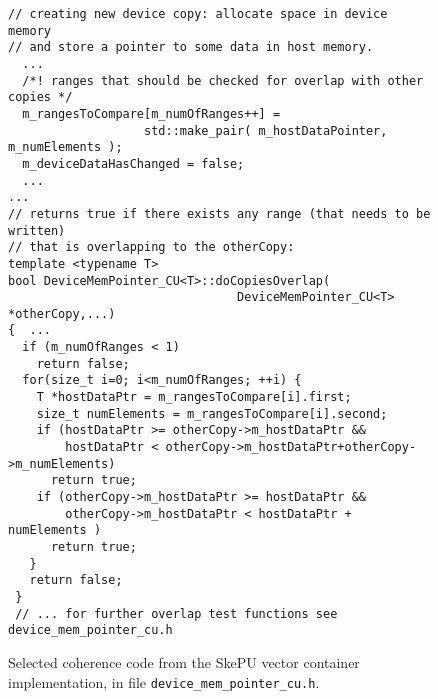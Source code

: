   
\begin{figure}
%
%
%
\begin{small}
\begin{verbatim}
// creating new device copy: allocate space in device memory
// and store a pointer to some data in host memory.
  ...
  /*! ranges that should be checked for overlap with other copies */
  m_rangesToCompare[m_numOfRanges++] =
                   std::make_pair( m_hostDataPointer, m_numElements );
  m_deviceDataHasChanged = false;
  ...
...
// returns true if there exists any range (that needs to be written)
// that is overlapping to the otherCopy:
template <typename T>
bool DeviceMemPointer_CU<T>::doCopiesOverlap(
                                DeviceMemPointer_CU<T> *otherCopy,...)
{  ...
  if (m_numOfRanges < 1)
    return false;
  for(size_t i=0; i<m_numOfRanges; ++i) {
    T *hostDataPtr = m_rangesToCompare[i].first;
    size_t numElements = m_rangesToCompare[i].second;
    if (hostDataPtr >= otherCopy->m_hostDataPtr &&
        hostDataPtr < otherCopy->m_hostDataPtr+otherCopy->m_numElements)
      return true;
    if (otherCopy->m_hostDataPtr >= hostDataPtr &&
        otherCopy->m_hostDataPtr < hostDataPtr + numElements )
      return true;
   }
   return false;
 }
 // ... for further overlap test functions see device_mem_pointer_cu.h
\end{verbatim}
\end{small}
%
\caption{\label{fig:skepucoherence3}Selected coherence code from the SkePU vector container implementation, in file \texttt{device\_mem\_pointer\_cu.h}.}
\end{figure}

